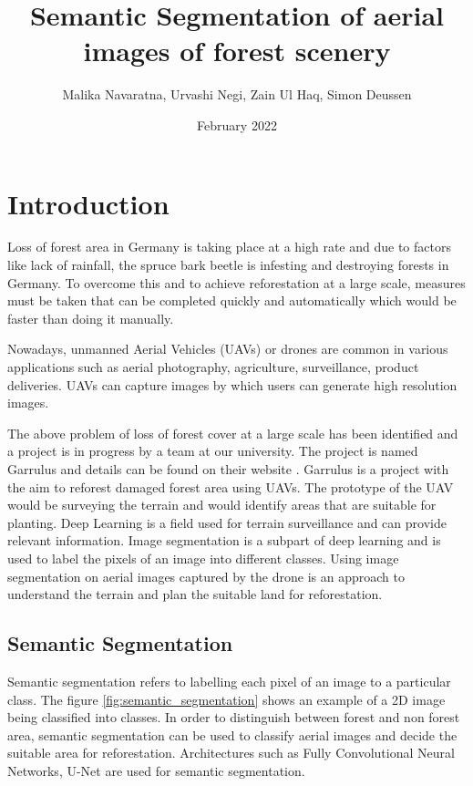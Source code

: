 \documentclass[rnd]{mas_proposal}
\title{Semantic Segmentation of aerial images of forest scenery}
\author{Malika Navaratna, Urvashi Negi, Zain Ul Haq, Simon Deussen}
\date{February 2022}
\begin{document}
\maketitle

\pagestyle{plain}

\section{Introduction}
Loss of forest area in Germany is taking place at a high rate and due to factors like lack of rainfall, the spruce bark beetle is infesting and destroying forests in Germany. To overcome this and to achieve reforestation at a large scale, measures must be taken that can be completed quickly and automatically which would be faster than doing it manually. 

Nowadays, unmanned Aerial Vehicles (UAVs) or drones are common in various applications such as aerial photography, agriculture, surveillance, product deliveries. UAVs can capture images by which users can generate high resolution images.  

The above problem of loss of forest cover at a large scale has been identified and a project is in progress by a team at our university. The project is named Garrulus and details can be found on their website \cite{hbrs-garrulus}. Garrulus is a project with the aim to reforest damaged forest area using UAVs. The prototype of the UAV would be surveying the terrain and would identify areas that are suitable for planting. 
Deep Learning is a field used for terrain surveillance and can provide relevant information. Image segmentation is a subpart of deep learning and is used to label the pixels of an image into different classes. Using image segmentation on aerial images captured by the drone is an approach to understand the terrain and plan the suitable land for reforestation.

\subsection{Semantic Segmentation}
Semantic segmentation refers to labelling each pixel of an image to a particular class. The figure \ref{fig:semantic_segmentation}  shows an example of a 2D image being classified into classes. In order to distinguish between forest and non forest area, semantic segmentation can be used to classify aerial images and decide the suitable area for reforestation. Architectures such as Fully Convolutional Neural Networks, U-Net are used for semantic segmentation.
\end{document}
